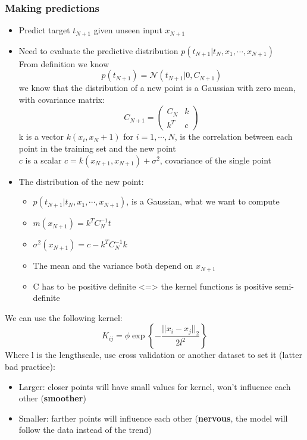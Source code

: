     \subsubsection{Making predictions}
    \begin{itemize}
        \item Predict target $t_{N+1}$ given unseen input $x_{N+1}$
        \item Need to evaluate the predictive distribution $p(t_{N+1}|t_N,x_1,\cdots,x_{N+1})$\\
        From definition we know
        $$p(t_{N+1})=\mathcal{N}(t_{N+1}|0,C_{N+1})$$
        we know that the distribution of a new point is a Gaussian with zero mean, with covariance matrix:
        $$
        C_{N+1}=
        \begin{pmatrix}
            C_N & k \\
            k^T & c
        \end{pmatrix}
        $$
        k is a vector $k(x_i,x_N+1)$ for $i=1,\cdots,N$, is the correlation between each point in the training set and the new point\\
        $c$ is a scalar $c=k(x_{N+1},x_{N+1})+\sigma^2$, covariance of the single point
        \item The distribution of the new point:
        \begin{itemize}
            \item $p(t_{N+1}|t_N,x_1,\cdots,x_{N+1})$, is a Gaussian, what we want to compute
            \item $m(x_{N+1})=k^TC^{-1}_Nt$
            \item $\sigma^2(x_{N+1})=c-k^TC^{-1}_Nk$
            \item The mean and the variance both depend on $x_{N+1}$
            \item C has to be positive definite <=> the kernel functions is positive semi-definite
        \end{itemize}
    \end{itemize}
    We can use the following kernel:
    $$K_{ij}=\phi\exp\left\{
        -\frac{||x_i-x_j||_2}{2l^2}
    \right\}$$
    Where l is the lengthscale, use cross validation or another dataset to set it (latter bad practice):
    \begin{itemize}
        \item Larger: closer points will have small values for kernel, won't influence each other (\textbf{smoother})
        \item Smaller: farther points will influence each other (\textbf{nervous}, the model will follow the data instead of the trend)
    \end{itemize}

